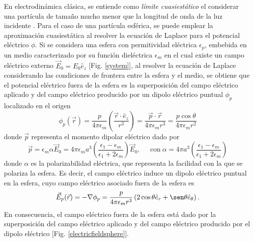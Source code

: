 En electrodinámica clásica, se entiende como \textit{límite cuasiestático} el considerar una partícula de tamaño mucho menor que la longitud de onda de la luz incidente \cite{Cuasiestatico}. Para el caso de una partícula esférica, se puede emplear la aproximación cuasiestática al resolver la ecuación de Laplace para el potencial eléctrico $\phi$. Si se considera una esfera con permitividad eléctrica $\epsilon_p$, embebida en un medio caracterizado por su función dieléctrica $\epsilon_m$ en el cual existe un campo eléctrico externo $\Vec{E}_0=E_0\hat{e}_z$ [Fig. \ref{system}], al resolver la ecuación de Laplace considerando las condiciones de frontera entre la esfera y el medio, se obtiene que el potencial eléctrico fuera de la esfera es la superposición del campo eléctrico aplicado y del campo eléctrico producido por un dipolo eléctrico puntual $\phi_p$ localizado en el origen \cite{Griffiths}
\begin{equation}
	\phi_p(\vec{r})=\frac{p}{4\pi\epsilon_m}\left(\frac{\Vec{r}\cdot\hat{e}_z}{r^3}\right)=\frac{\Vec{p}\cdot\Vec{r}}{4\pi\epsilon_m r^3}=\frac{p\cos\theta}{4\pi\epsilon_m r^2}
	\label{pot_dipolo}
\end{equation}
donde $\Vec{p}$ representa el momento dipolar eléctrico dado por \cite{Bohren}
\begin{equation*}
	\vec{p}= \epsilon_m\alpha\Vec{E}_0=4\pi\epsilon_m a^3\left(\frac{\epsilon_1-\epsilon_m}{\epsilon_1+2\epsilon_m}\right)\Vec{E}_0, \;\:\:\:\:\: \text{con}\; \alpha=4\pi a^3\left(\frac{\epsilon_1-\epsilon_m}{\epsilon_1+2\epsilon_m}\right) 
	\label{momentdipol}
\end{equation*}
donde $\alpha$ es la polarizabilidad eléctrica, que representa la facilidad con la que se polariza la esfera. Es decir, el campo eléctrico induce un dipolo eléctrico puntual en la esfera, cuyo campo eléctrico asociado fuera de la esfera es 
\begin{equation*}
	\Vec{E}_p(\vec{r})=-\nabla \phi_p =\frac{p}{4\pi \epsilon_m r^3 }\left(2\cos\theta\hat{e}_r+\sen\theta\hat{e}_{\theta}\right).
\end{equation*}
En consecuencia, el campo eléctrico fuera de la esfera está dado por la superposición del campo eléctrico aplicado y del campo eléctrico producido por el dipolo eléctrico [Fig. \ref{electricfieldsphere}].


